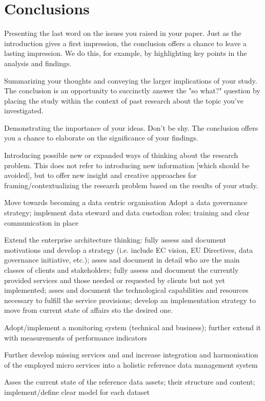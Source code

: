 \section{Conclusions}
\label{sec:conclusions}
	
 Presenting the last word on the issues you raised in your paper. Just as the introduction gives a first impression, the conclusion offers a chance to leave a lasting impression. We do this, for example, by highlighting key points in the analysis and findings.
 
 Summarizing your thoughts and conveying the larger implications of your study. The conclusion is an opportunity to succinctly answer the "so what?" question by placing the study within the context of past research about the topic you've investigated.
 
 Demonstrating the importance of your ideas. Don't be shy. The conclusion offers you a chance to elaborate on the significance of your findings.
 
 Introducing possible new or expanded ways of thinking about the research problem. This does not refer to introducing new information [which should be avoided], but to offer new insight and creative approaches for framing/contextualizing the research problem based on the results of your study.
 
 Move towards becoming a data centric organisation
 Adopt a data governance strategy; implement data steward and data custodian roles; training and clear communication in place
 
 Extend the enterprise architecture thinking: fully assess and document motivations and develop a strategy (i.e. include EC vision, EU Directives, data governance initiative, etc.); asses and document in detail who are the main classes of clients and stakeholders; fully assess and document the currently provided services and those needed or requested by clients but not yet implemented; asses and document the technological capabilities and resources necessary to fulfill the service provisions; develop an implementation strategy to move from current state of affairs sto the desired one.
 
 Adopt/implement a monitoring system (technical and business); further extend it with measurements of performance indicators
 
 Further develop missing services and and increase integration and harmonisation of the employed micro services into a holistic reference data management system
 
 Asses the current state of the reference data assets; their structure and content; implement/define clear model for each dataset 
 
